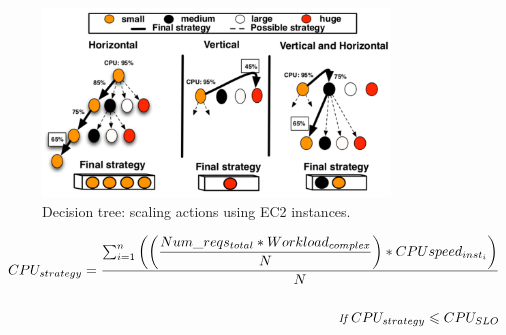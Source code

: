 \begin{figure}[htb]
  \begin{center}
    \includegraphics[width=\linewidth,height=5cm]{images/scalingTree}
  \end{center}
\vspace{-5mm}
  \caption{Decision tree: scaling actions using EC2 instances.}
  \label{fig:scalingTree}
\end{figure}




{\scriptsize
\begin{equation}\label{resource_combination}
\begin{split}
CPU_{strategy} = \dfrac{ \sum_{i=1}^n \bigg( \bigg( \dfrac{ Num\_reqs_{total} * Workload_{complex} }  {N}  \bigg) * CPU speed_{inst_{i}} \bigg) }  {N} \\ 
\\ {\small \textit{ If } CPU_{strategy} \leqslant CPU_{SLO} }
\end{split}
\end{equation}
}


